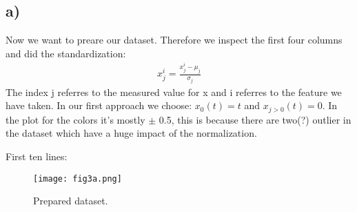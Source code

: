 \subsection{a)}
Now we want to preare our dataset. Therefore we inspect the first four columns and did the standardization:
\begin{align}
    x_j^{i} = \frac{x_j^{i} - \mu_j}{\sigma_j}
\end{align}
The index j referres to the measured value for x and i referres to the feature we have taken. In our first approach we choose: $x_0(t) = t$ and $x_{j>0}(t) = 0$. In the plot for the colors it's mostly $\pm$ 0.5, this is because there are two(?) outlier in the dataset which have a huge impact of the normalization.


First ten lines:



\begin{figure}[h!]
    \centering
    \texttt{[image: fig3a.png]}
    \caption{Prepared dataset.}
\end{figure}



